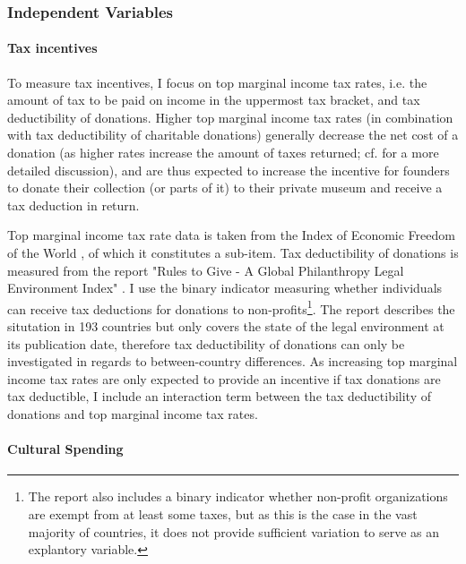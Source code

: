 \documentclass[11pt]{article}
\begin{document}
\subsubsection*{Independent Variables}

\paragraph*{Tax incentives}

To measure tax incentives, I focus on top marginal income tax rates, i.e. the amount of tax to be paid on income in the uppermost tax bracket, and tax deductibility of donations.
Higher top marginal income tax rates (in combination with tax deductibility of charitable donations) generally decrease the net cost of a donation (as higher rates increase the amount of taxes returned; cf. \cite{Hemels_2017_incentives} for a more detailed discussion), and are thus expected to increase the incentive for founders to donate their collection (or parts of it) to their private museum and receive a tax deduction in return. 


Top marginal income tax rate data is taken from the Index of Economic Freedom of the World \parencite{Fraser_2022_economic_freedom}, of which it constitutes a sub-item.
Tax deductibility of donations is measured from the report "Rules to Give - A Global Philanthropy Legal Environment Index" \parencite{Quick_Kruse_Pickering_2014_philanthropy}.
I use the binary indicator measuring whether individuals can receive tax deductions for donations to non-profits\footnote{The report also includes a binary indicator whether non-profit organizations are exempt from at least some taxes, but as this is the case in the vast majority of countries, it does not provide sufficient variation to serve as an explantory variable.}.
The report describes the situtation in 193 countries but only covers the state of the legal environment at its publication date, therefore tax deductibility of donations can only be investigated in regards to between-country differences.
As increasing top marginal income tax rates are only expected to provide an incentive if tax donations are tax deductible, I include an interaction term between the tax deductibility of donations and top marginal income tax rates. 

\paragraph*{Cultural Spending}
\end{document}
